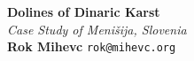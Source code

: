 \documentclass[a0,portrait]{a0poster}
\begin{document}


\begin{minipage}[b]{0.64\linewidth}
\veryHuge \color{NavyBlue} \textbf{Dolines of Dinaric Karst} \color{Black}\\ %
\Huge\textit{Case Study of Menišija, Slovenia}\\[1cm] %
\huge \textbf{Rok Mihevc} %
\Large \texttt{rok@mihevc.org}
\end{minipage}
%

\end{document}
